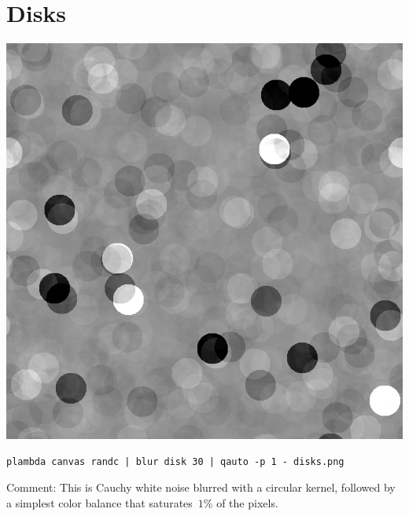 \section{Disks}
\includegraphics{disks.png}
\begin{verbatim}
plambda canvas randc | blur disk 30 | qauto -p 1 - disks.png
\end{verbatim}
Comment: This is Cauchy white noise blurred with a circular kernel, followed
by a simplest color balance that saturates~$1\%$ of the pixels.

